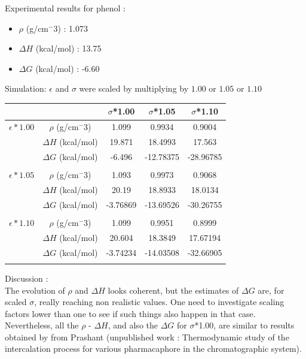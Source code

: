 \documentclass[12pt,a4paper]{article}
\begin{document}
Experimental results for phenol :

\begin{itemize}
\item $\rho$ (g/cm$^-3$) : 1.073
\item $\Delta H$ (kcal/mol) : 13.75
\item $\Delta G$ (kcal/mol) : -6.60
\end{itemize}

\medskip

Simulation: $\epsilon$ and $\sigma$ were scaled by multiplying by $1.00$ or $1.05$ or $1.10$

\begin{center}
\begin{tabular}{|c|c|c|c|c|}
\hline  &  & $\sigma$*1.00 & $\sigma$*1.05 & $\sigma$*1.10 \\ 
\hline $\epsilon*1.00$ & $\rho$ (g/cm$^-3$) & 1.099 & 0.9934 & 0.9004 \\ 
\hline  & $\Delta H$ (kcal/mol) & 19.871 & 18.4993 & 17.563 \\ 
\hline  & $\Delta G$ (kcal/mol) & -6.496 & -12.78375 & -28.96785 \\ 
\hline  &  &  &  &  \\ 
\hline $\epsilon*1.05$ & $\rho$ (g/cm$^-3$) & 1.093 & 0.9973 & 0.9068 \\ 
\hline  & $\Delta H$ (kcal/mol) & 20.19 & 18.8933 & 18.0134 \\ 
\hline  & $\Delta G$ (kcal/mol) & -3.76869 & -13.69526 & -30.26755 \\ 
\hline  &  &  &  &  \\ 
\hline $\epsilon*1.10$ & $\rho$ (g/cm$^-3$)& 1.099 & 0.9951 & 0.8999 \\ 
\hline  & $\Delta H$ (kcal/mol) & 20.604 & 18.3849 & 17.67194 \\ 
\hline  & $\Delta G$ (kcal/mol) & -3.74234 & -14.03508 & -32.66905 \\
\hline  &  &  &  &  \\ 
\hline 
\end{tabular} 
\end{center}

Discussion : \\


The evolution of $\rho$ and $\Delta H$ looks coherent, but the estimates of 
$\Delta G$ are, for scaled  $\sigma$, really reaching non realistic values. One need to investigate 
scaling factors lower than one to see if such things also happen in that case.\\



Nevertheless, all the $\rho$ - $\Delta H$, and also the $\Delta G$ for $\sigma$*1.00, are similar 
to results obtained by from Prashant (unpublished work : Thermodynamic study of the intercalation 
process for various
pharmacaphore in the chromatographic system).
\end{document}
